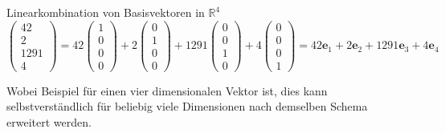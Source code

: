 \begin{beispiel}
Linearkombination von Basisvektoren in $\mathbb{R}^4$
    \begin{equation}
        \begin{pmatrix} 
        42 \\ 2 \\ 1291 \\ 4    
        \end{pmatrix} 
        = 
        42 \begin{pmatrix}
        1 \\ 0 \\ 0 \\ 0 
        \end{pmatrix} 
        +
        2 \begin{pmatrix} 
        0 \\ 1 \\ 0 \\ 0 
        \end{pmatrix}
        +
        1291 
        \begin{pmatrix} 
        0 \\ 0 \\ 1 \\ 0 
        \end{pmatrix} 
        +
        4 \begin{pmatrix} 
        0 \\ 0 \\ 0 \\ 1 
        \end{pmatrix} 
        = 
        42\textbf{e}_1
        + 
        2\textbf{e}_2
        + 
        1291\textbf{e}_3
        + 
        4\textbf{e}_4
    \end{equation}
\end{beispiel}
Wobei Beispiel für einen vier dimensionalen Vektor ist, dies kann selbstverständlich für beliebig viele Dimensionen nach demselben Schema erweitert werden.